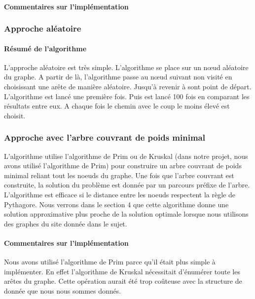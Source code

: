 \documentclass[10pt,a4paper]{report}
\begin{document}
		\paragraph{Commentaires sur l'implémentation\\}
		
		\subsubsection{Approche aléatoire}
		
		\paragraph{Résumé de l'algorithme\\}
		L'approche aléatoire est très simple. L'algorithme se place sur un nœud aléatoire du graphe. A partir de là, l'algorithme passe au nœud suivant non visité en choisissant une arête de manière aléatoire. Jusqu'à revenir à sont point de départ.
		L'algorithme est lancé une première fois. Puis est lancé 100 fois en comparant les résultats entre eux. A chaque fois le chemin avec le coup le moins élevé est choisit.

		\subsubsection{Approche avec l'arbre couvrant de poids minimal}
		\begin{flushleft}
		L'algorithme utilise l'algorithme de Prim ou de Kruskal (dans notre projet, nous avons utilisé l'algorithme de Prim) pour construire un arbre couvrant de poids minimal reliant tout les noeuds du graphe. Une fois que l'arbre couvrant est construite, la solution du problème est donnée par un parcours préfixe de l'arbre.
		L'algorithme est efficace si le distance entre les noeuds respectent la règle de Pythagore. Nous verrons dans le section 4 que cette algorithme donne une solution approximative plus proche de la solution optimale lorsque nous utilisons des graphes du site donnée dans le sujet.
		\end{flushleft}
			
		\paragraph{Commentaires sur l'implémentation}
		
		\begin{flushleft}
		Nous avons utilisé l'algorithme de Prim parce qu'il était plus simple à implémenter. En effet l'algorithme de Kruskal nécessitait d’énumérer toute les arêtes du graphe. Cette opération aurait été trop coûteuse avec la structure de donnée que nous nous sommes donnés.
		\end{flushleft}
		
\end{document}
